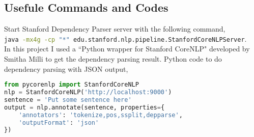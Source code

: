 \documentclass[letterpaper]{article}
\begin{document}
\begin{appendices}


\section{Usefule Commands and Codes}
Start Stanford Dependency Parser server with the following command, \\
\lstinline [language=bash]{java -mx4g -cp "*" edu.stanford.nlp.pipeline.StanfordCoreNLPServer}.\\

In this project I used a ``Python wrapper for Stanford CoreNLP" developed by Smitha Milli to get the dependency parsing result. Python code to do dependency parsing with JSON output,

\begin{lstlisting}[breaklines=true,language=Python]
from pycorenlp import StanfordCoreNLP
nlp = StanfordCoreNLP('http://localhost:9000')
sentence = 'Put some sentence here'
output = nlp.annotate(sentence, properties={
    'annotators': 'tokenize,pos,ssplit,depparse',
    'outputFormat': 'json'
})
\end{lstlisting}





\end{appendices}
\end{document}
